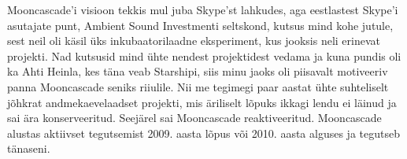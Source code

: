 Mooncascade'i visioon tekkis mul juba Skype'st lahkudes, aga 
eestlastest Skype'i asutajate punt, Ambient Sound 
Investmenti seltskond, kutsus mind kohe jutule, sest neil oli 
käsil üks inkubaatorilaadne eksperiment, kus jooksis neli 
erinevat projekti. Nad kutsusid mind ühte nendest projektidest vedama 
ja kuna pundis oli ka Ahti Heinla, kes 
täna veab Starshipi, siis minu jaoks oli piisavalt motiveeriv panna Mooncascade seniks riiulile. Nii me tegimegi paar aastat 
ühte suhteliselt jõhkrat andmekaevelaadset projekti, mis äriliselt 
lõpuks ikkagi lendu ei läinud ja sai ära konserveeritud. Seejärel sai Mooncascade 
reaktiveeritud. Mooncascade alustas aktiivset tegutsemist 2009. aasta lõpus või 2010. aasta 
alguses ja tegutseb tänaseni. 
